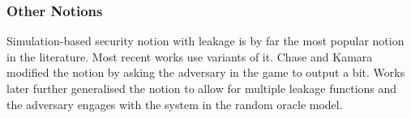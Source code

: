 \subsubsection{Other Notions}
Simulation-based security notion with leakage \cite{CCS:CGKO06} is by far the most popular notion in the literature. Most recent works use variants of it. Chase and Kamara \cite{AC:ChaKam10} modified the notion by asking the adversary in the game to output a bit. Works later \cite{CCS:KamPapRoe12, FC:KamPap13, NDSS:CJJJKR14} further generalised the notion to allow for multiple leakage functions and the adversary engages with the system in the random oracle model.



